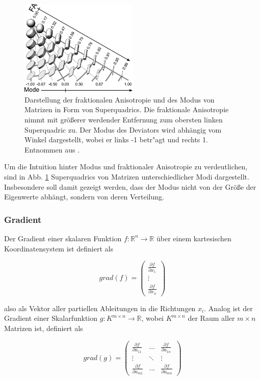 \documentclass[a4paper,fontsize=12pt,toc=bib,halfparskip]{scrartcl}
\begin{document}
\begin{figure}
	\centering
	\includegraphics[width=0.5\textwidth]{pictures/001.png}
	\caption{Darstellung der fraktionalen Anisotropie und des Modus von Matrizen in Form von Superquadrics\cite{kindlmann2004superquadric}. Die fraktionale Anisotropie nimmt mit gr\"o{\ss}erer werdender Entfernung zum obersten linken Superquadric zu. Der Modus des Deviators wird abh\"angig vom Winkel dargestellt, wobei er links -1 betr"agt und rechts 1. Entnommen aus \cite[S.~140]{ennis2006orthogonal}.}
	\label{Modus}
\end{figure}
Um die Intuition hinter Modus und fraktionaler Anisotropie zu verdeutlichen, sind in Abb. \ref{Modus} Superquadrics von Matrizen unterschiedlicher Modi dargestellt. Insbesondere soll damit gezeigt werden, dass der Modus nicht von der Gr\"o{\ss}e der Eigenwerte abh\"angt, sondern von deren Verteilung.

\subsubsection{Gradient}
Der Gradient einer skalaren Funktion $f: \mathbb{R}^n \rightarrow \mathbb{R}$  \"uber einem kartesischen Koordinatensystem ist definiert als

\begin{equation}
	grad(f) = 	
	\begin{pmatrix}
		\frac{\partial f}{\partial x_1} \\
		\vdots \\
		\frac{\partial f}{\partial x_n}
	\end{pmatrix}
\end{equation}

also als Vektor aller partiellen Ableitungen in die Richtungen $x_i$. Analog ist der Gradient einer Skalarfunktion $g: K^{m\times n} \rightarrow \mathbb{R}$, wobei $K^{m\times n}$ der Raum aller $m\times n$ Matrizen ist, definiert als

\begin{equation}
	grad(g) =
	\begin{pmatrix}
		\frac{\partial f}{\partial a_{11}} & \dots & \frac{\partial f}{\partial a_{1n}}  \\
		\vdots & \ddots & \vdots \\
		\frac{\partial f}{\partial a_{m1}} & \dots & \frac{\partial f}{\partial a_{mn}} 
	\end{pmatrix}
\end{equation}
\end{document}
